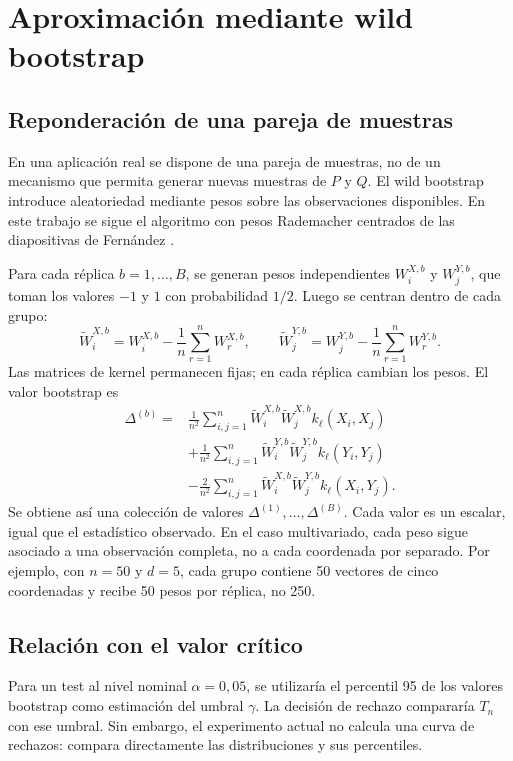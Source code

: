 \documentclass[11pt,a4paper]{article}
\begin{document}
\section{Aproximación mediante wild bootstrap}
\subsection{Reponderación de una pareja de muestras}
En una aplicación real se dispone de una pareja de muestras, no de un mecanismo que permita generar nuevas muestras de $P$ y $Q$. El wild bootstrap introduce aleatoriedad mediante pesos sobre las observaciones disponibles. En este trabajo se sigue el algoritmo con pesos Rademacher centrados de las diapositivas de Fernández \cite{fernandez2021}.

Para cada réplica $b=1,\ldots,B$, se generan pesos independientes $W_i^{X,b}$ y $W_j^{Y,b}$, que toman los valores $-1$ y $1$ con probabilidad $1/2$. Luego se centran dentro de cada grupo:
\begin{equation}
\widetilde W_i^{X,b}=W_i^{X,b}-\frac{1}{n}\sum_{r=1}^{n}W_r^{X,b},
\qquad
\widetilde W_j^{Y,b}=W_j^{Y,b}-\frac{1}{n}\sum_{r=1}^{n}W_r^{Y,b}.
\end{equation}
Las matrices de kernel permanecen fijas; en cada réplica cambian los pesos. El valor bootstrap es
\begin{align}\label{eq:wb}
\Delta^{(b)}={}&\frac{1}{n^2}\sum_{i,j=1}^{n}
\widetilde W_i^{X,b}\widetilde W_j^{X,b}k_\ell(X_i,X_j)\nonumber\\
&+\frac{1}{n^2}\sum_{i,j=1}^{n}
\widetilde W_i^{Y,b}\widetilde W_j^{Y,b}k_\ell(Y_i,Y_j)\nonumber\\
&-\frac{2}{n^2}\sum_{i,j=1}^{n}
\widetilde W_i^{X,b}\widetilde W_j^{Y,b}k_\ell(X_i,Y_j).
\end{align}
Se obtiene así una colección de valores $\Delta^{(1)},\ldots,\Delta^{(B)}$. Cada valor es un escalar, igual que el estadístico observado. En el caso multivariado, cada peso sigue asociado a una observación completa, no a cada coordenada por separado. Por ejemplo, con $n=50$ y $d=5$, cada grupo contiene 50 vectores de cinco coordenadas y recibe 50 pesos por réplica, no 250.

\subsection{Relación con el valor crítico}
Para un test al nivel nominal $\alpha=0{,}05$, se utilizaría el percentil 95 de los valores bootstrap como estimación del umbral $\gamma$. La decisión de rechazo compararía $T_n$ con ese umbral. Sin embargo, el experimento actual no calcula una curva de rechazos: compara directamente las distribuciones y sus percentiles.
\end{document}
